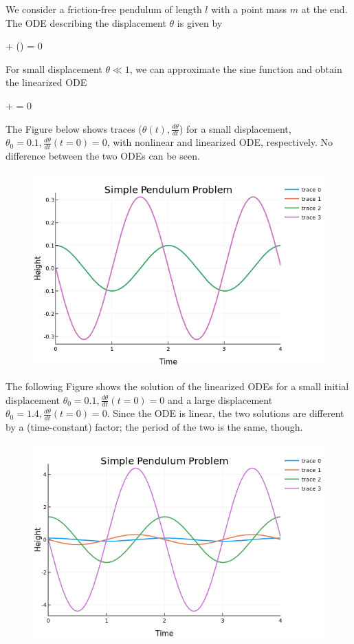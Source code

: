 
We consider a friction-free pendulum of length $l$ with a point mass $m$ at the end. The ODE describing the displacement $\theta$ is given by

\bee
{} +  \sin(\theta) = 0
\eee

For small displacement $\theta \ll 1$, we can approximate the sine function and obtain the linearized ODE

\bee
{} +  \theta = 0
\eee

The Figure below shows traces ($\theta(t), \frac{d\theta}{dt}$) for a small displacement, $\theta_0 = 0.1, \frac{d\theta}{dt}(t=0) = 0$, with nonlinear and linearized ODE, respectively. No difference between the two ODEs can be seen.

\begin{figure}[H]
  \includegraphics[scale=0.5]{images/pendulum_1_1.png}
\end{figure}

The following Figure shows the solution of the linearized ODEs for a small initial displacement $\theta_0 = 0.1, \frac{d\theta}{dt}(t=0) = 0$ and a large displacement $\theta_0 = 1.4, \frac{d\theta}{dt}(t=0) = 0$. Since the ODE is linear, the two solutions are different by a (time-constant) factor; the period of the two is the same, though.

\begin{figure}[H]
  \includegraphics[scale=0.5]{images/pendulum_1_2.png}
\end{figure}



